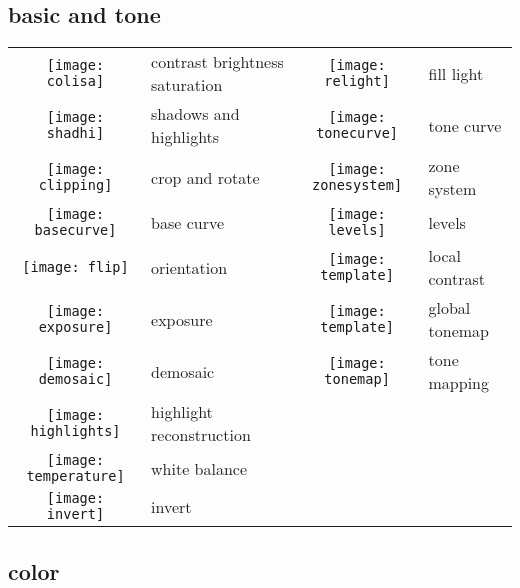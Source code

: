 \documentclass[\ArgLang,\ArgFormat,9pt]{extarticle}
\begin{document}
\begin{multicols}{3}
  \subsection{basic and tone}

  \colorbox{keycol}{%
    \begin{tabularx}{\tabwidth}{clcl}
      \texttt{[image: colisa]} & contrast brightness saturation & \texttt{[image: relight]} & fill light \\
      \texttt{[image: shadhi]} & shadows and highlights         & \texttt{[image: tonecurve]} & tone curve \\
      \texttt{[image: clipping]} & crop and rotate              & \texttt{[image: zonesystem]} & zone system \\
      \texttt{[image: basecurve]} & base curve                  & \texttt{[image: levels]} & levels \\
      \texttt{[image: flip]} & orientation                      & \texttt{[image: template]} & local contrast \\
      \texttt{[image: exposure]} & exposure                     & \texttt{[image: template]} & global tonemap \\
      \texttt{[image: demosaic]} & demosaic                     & \texttt{[image: tonemap]} & tone mapping \\
      \texttt{[image: highlights]} & highlight reconstruction \\
      \texttt{[image: temperature]} & white balance \\
      \texttt{[image: invert]} & invert \\
    \end{tabularx}}
  
  \subsection{color}


\end{multicols}
\end{document}
